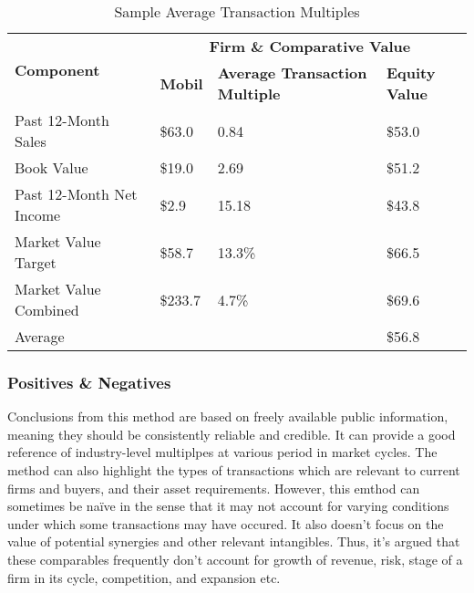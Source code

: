 \documentclass[11pt, english]{article}
\begin{document}
        \begin{table}[h]
                \scriptsize
                \renewcommand{\arraystretch}{1.25}
        \begin{center}
        \begin{tabular}{p{3.5cm}|p{2cm}p{4.5cm}|p{2cm}}
                \multirow{2}{*}{\textbf{Component}} & \multicolumn{3}{c}{\textbf{Firm \& Comparative Value}}\\
                \cline{2-4}
                & \textbf{Mobil} & \textbf{Average Transaction Multiple} & \textbf{Equity Value}\\
                \hline
                Past 12-Month Sales & \$63.0 & 0.84 & \$53.0\\
                Book Value & \$19.0 & 2.69 & \$51.2\\
                Past 12-Month Net Income & \$2.9 & 15.18 & \$43.8\\
                Market Value Target & \$58.7 & 13.3\% & \$66.5\\
                Market Value Combined & \$233.7 & 4.7\% & \$69.6\\
                \cline{4-4}
                Average & \multicolumn{2}{c|}{} & \$56.8\\
                \hline
        \end{tabular}
                \caption{Sample Average Transaction Multiples}
        \end{center}
        \end{table}

                \subsubsection*{Positives \& Negatives}

        Conclusions from this method are based on freely available public information, meaning they should be consistently reliable and credible. It can provide a good reference of industry-level multiplpes at various period in market cycles. The method can also highlight the types of transactions which are relevant to current firms and buyers, and their asset requirements. However, this emthod can sometimes be na\"{i}ve in the sense that it may not account for varying conditions under which some transactions may have occured. It also doesn't focus on the value of potential synergies and other relevant intangibles. Thus, it's argued that these comparables frequently don't account for growth of revenue, risk, stage of a firm in its cycle, competition, and expansion etc.
\end{document}
